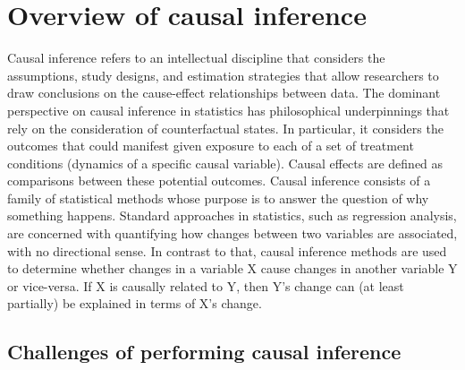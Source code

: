\documentclass[%
 aps,
 jmp,%
 amsmath,amssymb,
 reprint,%
]{revtex4-2}
\begin{document}
\section{\label{sec:overview-causal-inference}Overview of causal inference}
Causal inference refers to an intellectual discipline that considers the assumptions, study designs, and estimation strategies that allow researchers to draw conclusions on the cause-effect relationships between data. 
The dominant perspective on causal inference in statistics has philosophical underpinnings that rely on the consideration of counterfactual states. 
In particular, it considers the outcomes that could manifest given exposure to each of a set of treatment conditions (dynamics of a specific causal variable). 
Causal effects are defined as comparisons between these potential outcomes. 
Causal inference consists of a family of statistical methods whose purpose is to answer the question of why something happens. 
Standard approaches in statistics, such as regression analysis, are concerned with quantifying how changes between two variables are associated, with no directional sense. 
In contrast to that, causal inference methods are used to determine whether changes in a variable X cause changes in another variable Y or vice-versa. 
If X is causally related to Y, then Y's change can (at least partially) be explained in terms of X's change.

\subsection{Challenges of performing causal inference}
\end{document}
